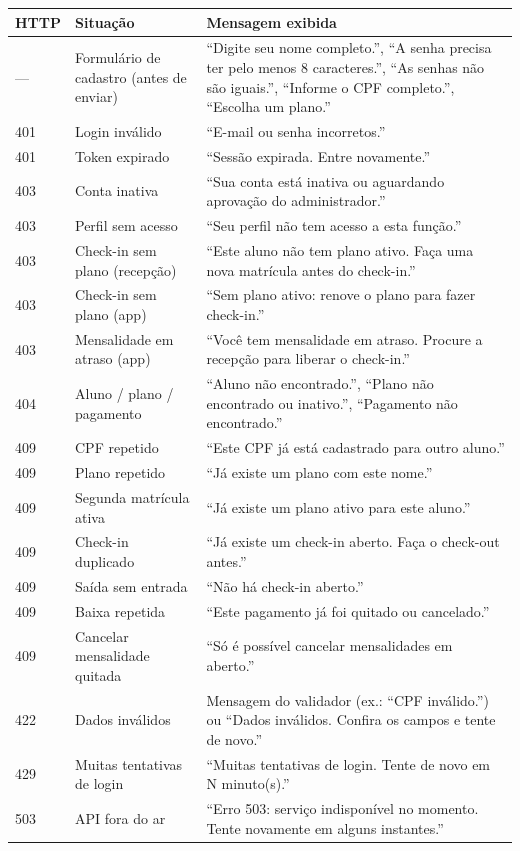 \documentclass[11pt,a4paper,final]{article}
\begin{document}
\begin{xltabular}{\textwidth}{l l Y}
  \toprule
  \textbf{HTTP} & \textbf{Situação} & \textbf{Mensagem exibida} \\
  \midrule
  \endhead
  --- & Formulário de cadastro (antes de enviar) & ``Digite seu nome completo.'', ``A senha precisa ter pelo menos 8 caracteres.'', ``As senhas não são iguais.'', ``Informe o CPF completo.'', ``Escolha um plano.'' \\
  401 & Login inválido                  & ``E-mail ou senha incorretos.'' \\
  401 & Token expirado                  & ``Sessão expirada. Entre novamente.'' \\
  403 & Conta inativa                   & ``Sua conta está inativa ou aguardando aprovação do administrador.'' \\
  403 & Perfil sem acesso               & ``Seu perfil não tem acesso a esta função.'' \\
  403 & Check-in sem plano (recepção)   & ``Este aluno não tem plano ativo. Faça uma nova matrícula antes do check-in.'' \\
  403 & Check-in sem plano (app)        & ``Sem plano ativo: renove o plano para fazer check-in.'' \\
  403 & Mensalidade em atraso (app)     & ``Você tem mensalidade em atraso. Procure a recepção para liberar o check-in.'' \\
  404 & Aluno / plano / pagamento       & ``Aluno não encontrado.'', ``Plano não encontrado ou inativo.'', ``Pagamento não encontrado.'' \\
  409 & CPF repetido                    & ``Este CPF já está cadastrado para outro aluno.'' \\
  409 & Plano repetido                  & ``Já existe um plano com este nome.'' \\
  409 & Segunda matrícula ativa         & ``Já existe um plano ativo para este aluno.'' \\
  409 & Check-in duplicado              & ``Já existe um check-in aberto. Faça o check-out antes.'' \\
  409 & Saída sem entrada               & ``Não há check-in aberto.'' \\
  409 & Baixa repetida                  & ``Este pagamento já foi quitado ou cancelado.'' \\
  409 & Cancelar mensalidade quitada    & ``Só é possível cancelar mensalidades em aberto.'' \\
  422 & Dados inválidos                 & Mensagem do validador (ex.: ``CPF inválido.'') ou ``Dados inválidos. Confira os campos e tente de novo.'' \\
  429 & Muitas tentativas de login      & ``Muitas tentativas de login. Tente de novo em N minuto(s).'' \\
  503 & API fora do ar                  & ``Erro 503: serviço indisponível no momento. Tente novamente em alguns instantes.'' \\
  \bottomrule
\end{xltabular}
\end{document}
